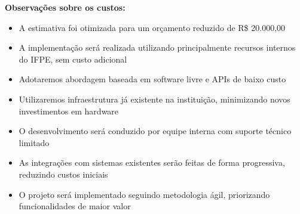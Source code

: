 \documentclass[12pt,a4paper]{article}
\begin{document}
\begin{table}[htbp]
\centering
{}
\caption{Custos Associados à Implantação}
\end{table}

\textbf{Observações sobre os custos:}
\begin{itemize}
    \item A estimativa foi otimizada para um orçamento reduzido de R\$ 20.000,00
    \item A implementação será realizada utilizando principalmente recursos internos do IFPE, sem custo adicional
    \item Adotaremos abordagem baseada em software livre e APIs de baixo custo
    \item Utilizaremos infraestrutura já existente na instituição, minimizando novos investimentos em hardware
    \item O desenvolvimento será conduzido por equipe interna com suporte técnico limitado
    \item As integrações com sistemas existentes serão feitas de forma progressiva, reduzindo custos iniciais
    \item O projeto será implementado seguindo metodologia ágil, priorizando funcionalidades de maior valor
\end{itemize}
\end{document}

